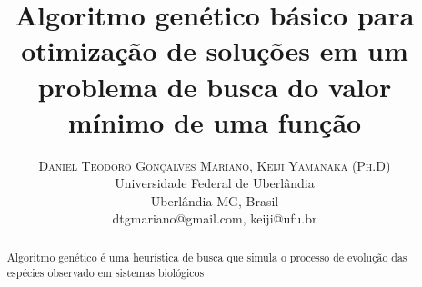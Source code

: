 \documentclass[twoside]{article}
\title{\vspace{-15mm}\fontsize{24pt}{10pt}\selectfont\textbf{Algoritmo genético básico para otimização de soluções em um problema de busca do valor mínimo de uma função}} %
\author{
\large
\textsc{Daniel Teodoro Gonçalves Mariano, Keiji Yamanaka (Ph.D)}\\[2mm] %
\normalsize Universidade Federal de Uberlândia\\ \normalsize Uberlândia-MG, Brasil \\ %
\normalsize {dtgmariano@gmail.com, keiji@ufu.br} %
\vspace{-5mm}
}
\date{}
\begin{document}
\maketitle %

\thispagestyle{fancy} %



\begin{abstract}
\noindent
Algoritmo genético é uma heurística de busca que simula o processo de evolução das espécies observado em sistemas biológicos
\end{abstract}

\end{document}
